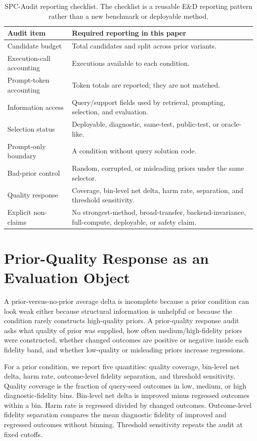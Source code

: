 \documentclass{article}
\begin{document}
\begin{table}[H]
\caption{SPC-Audit reporting checklist. The checklist is a reusable E\&D reporting pattern rather than a new benchmark or deployable method.}
\label{tab:audit-checklist}
\centering
\footnotesize
\begin{tabularx}{\linewidth}{l Y}
\toprule
Audit item & Required reporting in this paper \\
\midrule
Candidate budget & Total candidates and split across prior variants. \\
Execution-call accounting & Executions available to each condition. \\
Prompt-token accounting & Token totals are reported; they are not matched. \\
Information access & Query/support fields used by retrieval, prompting, selection, and evaluation. \\
Selection status & Deployable, diagnostic, same-test, public-test, or oracle-like. \\
Prompt-only boundary & A condition without query solution code. \\
Bad-prior control & Random, corrupted, or misleading priors under the same selector. \\
Quality response & Coverage, bin-level net delta, harm rate, separation, and threshold sensitivity. \\
Explicit non-claims & No strongest-method, broad-transfer, backend-invariance, full-compute, deployable, or safety claim. \\
\bottomrule
\end{tabularx}
\end{table}

\section{Prior-Quality Response as an Evaluation Object}
A prior-versus-no-prior average delta is incomplete because a prior condition can look weak either because structural information is unhelpful or because the condition rarely constructs high-quality priors. A prior-quality response audit asks what quality of prior was supplied, how often medium/high-fidelity priors were constructed, whether changed outcomes are positive or negative inside each fidelity band, and whether low-quality or misleading priors increase regressions.

For a prior condition, we report five quantities: quality coverage, bin-level net delta, harm rate, outcome-level fidelity separation, and threshold sensitivity. Quality coverage is the fraction of query-seed outcomes in low, medium, or high diagnostic-fidelity bins. Bin-level net delta is improved minus regressed outcomes within a bin. Harm rate is regressed divided by changed outcomes. Outcome-level fidelity separation compares the mean diagnostic fidelity of improved and regressed outcomes without binning. Threshold sensitivity repeats the audit at fixed cutoffs.
\end{document}
